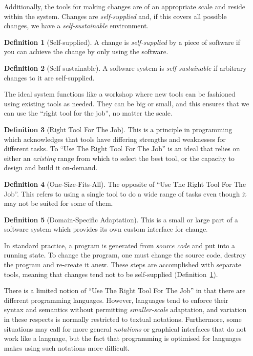 \documentclass[ twoside,openright,titlepage,numbers=noenddot,headinclude,footinclude,cleardoublepage=empty,abstract=on,
                BCOR=5mm,paper=a4,fontsize=11pt
                ]{scrreprt}
\newcommand{\RTFJ}{Right Tool For The Job}
\newcommand{\URTFJ}{Use The \RTFJ}
\theoremstyle{definition}
\newtheorem{defn}{Definition}
\begin{document}
Additionally, the tools for making changes are of an appropriate scale
and reside within the system. Changes are \emph{self-supplied} and, if
this covers all possible changes, we have a \emph{self-sustainable}
environment.

\begin{defn}[Self-supplied]
\label{def:self-supplied}
A change is \emph{self-supplied} by a piece of software if you can achieve the change by only using the software.
\end{defn}

\begin{defn}[Self-sustainable]
\label{def:self-sustainable}
A software system is \emph{self-sustainable} if arbitrary changes to it are self-supplied.
\end{defn}

The ideal system functions like a workshop where new tools can be
fashioned using existing tools as needed. They can be big or small, and
this ensures that we can use the ``right tool for the job'', no matter
the scale.

\begin{defn}[\RTFJ]
\label{def:right-tool}
This is a principle in programming which acknowledges that tools have differing strengths and weaknesses for different tasks. To ``\URTFJ'' is an ideal that relies on either an \emph{existing} range from which to select the best tool, or the capacity to design and build it on-demand.
\end{defn}

\begin{defn}[One-Size-Fits-All]
\label{def:osfa}
The opposite of ``\URTFJ''. This refers to using a single tool to do a wide range of tasks even though it may not be suited for some of them.
\end{defn}

\begin{defn}[Domain-Specific Adaptation]
\label{def:dsa}
This is a small or large part of a software system which provides its own custom interface for change.
\end{defn}

In standard practice, a program is generated from \emph{source code} and
put into a running state. To change the program, one must change the
source code, destroy the program and re-create it anew. These steps are
accomplished with separate tools, meaning that changes tend not to be
self-supplied (Definition~\ref{def:self-supplied}).

There is a limited notion of ``\URTFJ'' in that there are different
programming languages. However, languages tend to enforce their syntax
and semantics without permitting \emph{smaller-scale} adaptation, and
variation in these respects is normally restricted to textual notations.
Furthermore, some situations may call for more general \emph{notations}
or graphical interfaces that do not work like a language, but the fact
that programming is optimised for languages makes using such notations
more difficult.
\end{document}
